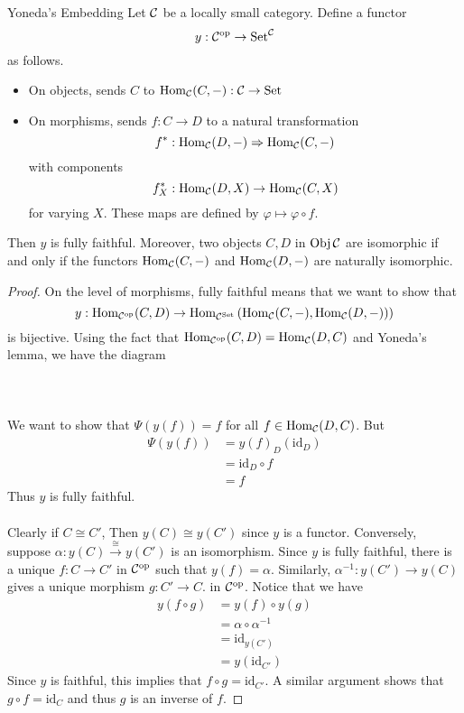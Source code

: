 \documentclass[a4paper]{article}
\begin{document}
\begin{crl}{Yoneda's Embedding}{} Let $\mathcal{C}$ be a locally small category. Define a functor $$y:\mathcal{C}^{\text{op}}\to\text{Set}^{\mathcal{C}}$$ as follows. 
\begin{itemize}
\item On objects, sends $C$ to $\operatorname{Hom}_{\mathcal{C}}(C,-):\mathcal{C}\to\text{Set}$
\item On morphisms, sends $f:C\to D$ to a natural transformation $$f^\ast:\operatorname{Hom}_{\mathcal{C}}(D,-)\Rightarrow\operatorname{Hom}_{\mathcal{C}}(C,-)$$ with components $$f_X^\ast:\operatorname{Hom}_{\mathcal{C}}(D,X)\to\operatorname{Hom}_{\mathcal{C}}(C,X)$$ for varying $X$. These maps are defined by $\varphi\mapsto\varphi\circ f$. 
\end{itemize}
Then $y$ is fully faithful. Moreover, two objects $C,D$ in $\operatorname{Obj}\mathcal{C}$ are isomorphic if and only if the functors $\operatorname{Hom}_{\mathcal{C}}(C,-)$ and $\operatorname{Hom}_{\mathcal{C}}(D,-)$ are naturally isomorphic. \tcbline
\begin{proof}
On the level of morphisms, fully faithful means that we want to show that $$y:\operatorname{Hom}_{\mathcal{C}^{\text{op}}}(C,D)\to\operatorname{Hom}_{\mathcal{C}^{\text{Set}}}\left(\operatorname{Hom}_{\mathcal{C}}(C,-),\operatorname{Hom}_{\mathcal{C}}(D,-))\right)$$ is bijective. Using the fact that $\operatorname{Hom}_{\mathcal{C}^{\text{op}}}(C,D)=\operatorname{Hom}_{\mathcal{C}}(D,C)$ and Yoneda's lemma, we have the diagram \\~\\
\\~\\ We want to show that $\Psi(y(f))=f$ for all $f\in\operatorname{Hom}_{\mathcal{C}}(D,C)$. But 
\begin{align*}
\Psi(y(f))&=y(f)_D(\text{id}_D)\\
&=\text{id}_D\circ f\\
&=f
\end{align*}
Thus $y$ is fully faithful. \\~\\
Clearly if $C\cong C'$, Then $y(C)\cong y(C')$ since $y$ is a functor. Conversely, suppose $\alpha:y(C)\overset{\cong}{\rightarrow}y(C')$ is an isomorphism. Since $y$ is fully faithful, there is a unique $f:C\to C'$ in $\mathcal{C}^{\text{op}}$ such that $y(f)=\alpha$. Similarly, $\alpha^{-1}:y(C')\to y(C)$ gives a unique morphism $g:C'\to C$. in $\mathcal{C}^{\text{op}}$. Notice that we have
\begin{align*}
y(f\circ g)&=y(f)\circ y(g)\\
&=\alpha\circ\alpha^{-1}\\
&=\text{id}_{y(C')}\\
&=y(\text{id}_{C'})
\end{align*}
Since $y$ is faithful, this implies that $f\circ g=\text{id}_{C'}$. A similar argument shows that $g\circ f=\text{id}_C$ and thus $g$ is an inverse of $f$. 
\end{proof}
\end{crl}
\end{document}
